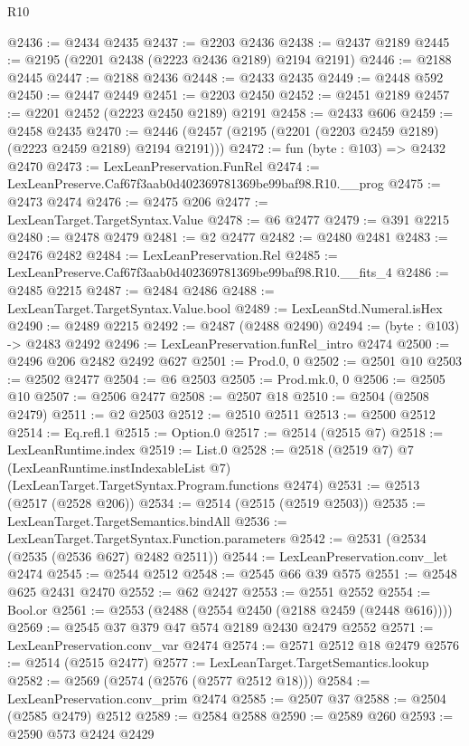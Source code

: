 \begin{lexlean}{R10}
\begin{coremodule}
@2436 := @2434 @2435
@2437 := @2203 @2436
@2438 := @2437 @2189
@2445 := @2195 (@2201 @2438 (@2223 @2436 @2189) @2194 @2191)
@2446 := @2188 @2445
@2447 := @2188 @2436
@2448 := @2433 @2435
@2449 := @2448 @592
@2450 := @2447 @2449
@2451 := @2203 @2450
@2452 := @2451 @2189
@2457 := @2201 @2452 (@2223 @2450 @2189) @2191
@2458 := @2433 @606
@2459 := @2458 @2435
@2470 := @2446 (@2457 (@2195 (@2201 (@2203 @2459 @2189) (@2223 @2459 @2189) @2194 @2191)))
@2472 := fun (byte : @103) => @2432 @2470
@2473 := LexLeanPreservation.FunRel
@2474 := LexLeanPreserve.Caf67f3aab0d402369781369be99baf98.R10.__prog
@2475 := @2473 @2474
@2476 := @2475 @206
@2477 := LexLeanTarget.TargetSyntax.Value
@2478 := @6 @2477
@2479 := @391 @2215
@2480 := @2478 @2479
@2481 := @2 @2477
@2482 := @2480 @2481
@2483 := @2476 @2482
@2484 := LexLeanPreservation.Rel
@2485 := LexLeanPreserve.Caf67f3aab0d402369781369be99baf98.R10.__fits_4
@2486 := @2485 @2215
@2487 := @2484 @2486
@2488 := LexLeanTarget.TargetSyntax.Value.bool
@2489 := LexLeanStd.Numeral.isHex
@2490 := @2489 @2215
@2492 := @2487 (@2488 @2490)
@2494 := (byte : @103) -> @2483 @2492
@2496 := LexLeanPreservation.funRel_intro @2474
@2500 := @2496 @206 @2482 @2492 @627
@2501 := Prod.{0, 0}
@2502 := @2501 @10
@2503 := @2502 @2477
@2504 := @6 @2503
@2505 := Prod.mk.{0, 0}
@2506 := @2505 @10
@2507 := @2506 @2477
@2508 := @2507 @18
@2510 := @2504 (@2508 @2479)
@2511 := @2 @2503
@2512 := @2510 @2511
@2513 := @2500 @2512
@2514 := Eq.refl.{1}
@2515 := Option.{0}
@2517 := @2514 (@2515 @7)
@2518 := LexLeanRuntime.index
@2519 := List.{0}
@2528 := @2518
    (@2519 @7)
    @7
    (LexLeanRuntime.instIndexableList @7)
    (LexLeanTarget.TargetSyntax.Program.functions @2474)
@2531 := @2513 (@2517 (@2528 @206))
@2534 := @2514 (@2515 (@2519 @2503))
@2535 := LexLeanTarget.TargetSemantics.bindAll
@2536 := LexLeanTarget.TargetSyntax.Function.parameters
@2542 := @2531 (@2534 (@2535 (@2536 @627) @2482 @2511))
@2544 := LexLeanPreservation.conv_let @2474
@2545 := @2544 @2512
@2548 := @2545 @66 @39 @575
@2551 := @2548 @625 @2431 @2470
@2552 := @62 @2427
@2553 := @2551 @2552
@2554 := Bool.or
@2561 := @2553 (@2488 (@2554 @2450 (@2188 @2459 (@2448 @616))))
@2569 := @2545 @37 @379 @47 @574 @2189 @2430 @2479 @2552
@2571 := LexLeanPreservation.conv_var @2474
@2574 := @2571 @2512 @18 @2479
@2576 := @2514 (@2515 @2477)
@2577 := LexLeanTarget.TargetSemantics.lookup
@2582 := @2569 (@2574 (@2576 (@2577 @2512 @18)))
@2584 := LexLeanPreservation.conv_prim @2474
@2585 := @2507 @37
@2588 := @2504 (@2585 @2479) @2512
@2589 := @2584 @2588
@2590 := @2589 @260
@2593 := @2590 @573 @2424 @2429

\end{coremodule}
\end{lexlean}
